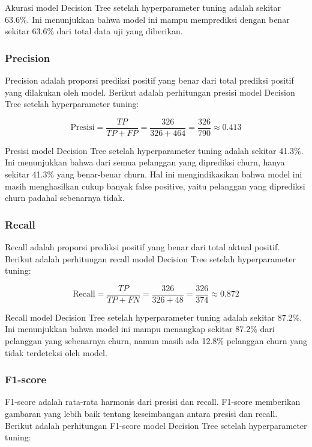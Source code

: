 Akurasi model Decision Tree setelah hyperparameter tuning adalah sekitar 63.6\%. Ini menunjukkan bahwa model ini mampu memprediksi dengan benar sekitar 63.6\% dari total data uji yang diberikan.

\subsubsection*{Precision}
Precision adalah proporsi prediksi positif yang benar dari total prediksi positif yang dilakukan oleh model. Berikut adalah perhitungan presisi model Decision Tree setelah hyperparameter tuning:

\begin{equation}
    \text{Presisi} = \frac{TP}{TP + FP} = \frac{326}{326 + 464} = \frac{326}{790} \approx 0.413
\end{equation}

Presisi model Decision Tree setelah hyperparameter tuning adalah sekitar 41.3\%. Ini menunjukkan bahwa dari semua pelanggan yang diprediksi churn, hanya sekitar 41.3\% yang benar-benar churn. Hal ini mengindikasikan bahwa model ini masih menghasilkan cukup banyak false positive, yaitu pelanggan yang diprediksi churn padahal sebenarnya tidak.

\subsubsection*{Recall}
Recall adalah proporsi prediksi positif yang benar dari total aktual positif. Berikut adalah perhitungan recall model Decision Tree setelah hyperparameter tuning:

\begin{equation}
    \text{Recall} = \frac{TP}{TP + FN} = \frac{326}{326 + 48} = \frac{326}{374} \approx 0.872
\end{equation}

Recall model Decision Tree setelah hyperparameter tuning adalah sekitar 87.2\%. Ini menunjukkan bahwa model ini mampu menangkap sekitar 87.2\% dari pelanggan yang sebenarnya churn, namun masih ada 12.8\% pelanggan churn yang tidak terdeteksi oleh model.

\subsubsection*{F1-score}
F1-score adalah rata-rata harmonis dari presisi dan recall. F1-score memberikan gambaran yang lebih baik tentang keseimbangan antara presisi dan recall. Berikut adalah perhitungan F1-score model Decision Tree setelah hyperparameter tuning:

